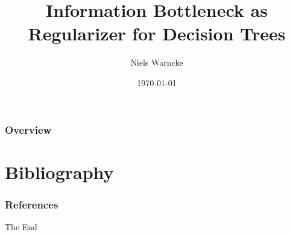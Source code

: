 \documentclass{beamer}
\title[Information Bottleneck Decision Trees]{Information Bottleneck as Regularizer for Decision Trees} %
\author{Niels Warncke} %
\institute[TUB] %
{
Technische Universität Berlin \\ %
\medskip
\textit{niels.warncke@gmail.com} %
}
\date{\today} %
\begin{document}
\begin{frame}
\titlepage %
\end{frame}

\begin{frame}
\frametitle{Overview} %
\tableofcontents %
\end{frame}

%










\section{Bibliography}


\begin{frame}[t, allowframebreaks]
    \frametitle{References}
    
    
\end{frame}


\begin{frame}
\Huge{\centerline{The End}}
\end{frame}

\end{document}
